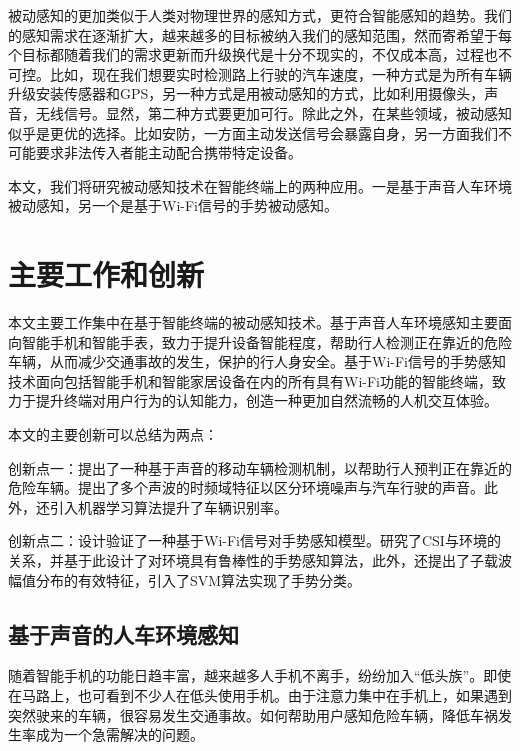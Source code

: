 
被动感知的更加类似于人类对物理世界的感知方式，更符合智能感知的趋势。我们的感知需求在逐渐扩大，越来越多的目标被纳入我们的感知范围，然而寄希望于每个目标都随着我们的需求更新而升级换代是十分不现实的，不仅成本高，过程也不可控。比如，现在我们想要实时检测路上行驶的汽车速度，一种方式是为所有车辆升级安装传感器和GPS，另一种方式是用被动感知的方式，比如利用摄像头，声音，无线信号。显然，第二种方式要更加可行。除此之外，在某些领域，被动感知似乎是更优的选择。比如安防，一方面主动发送信号会暴露自身，另一方面我们不可能要求非法传入者能主动配合携带特定设备。%

本文，我们将研究被动感知技术在智能终端上的两种应用。一是基于声音人车环境被动感知，另一个是基于Wi-Fi信号的手势被动感知。

\section{主要工作和创新}

本文主要工作集中在基于智能终端的被动感知技术。基于声音人车环境感知主要面向智能手机和智能手表，致力于提升设备智能程度，帮助行人检测正在靠近的危险车辆，从而减少交通事故的发生，保护的行人身安全。基于Wi-Fi信号的手势感知技术面向包括智能手机和智能家居设备在内的所有具有Wi-Fi功能的智能终端，致力于提升终端对用户行为的认知能力，创造一种更加自然流畅的人机交互体验。

本文的主要创新可以总结为两点：

创新点一：提出了一种基于声音的移动车辆检测机制，以帮助行人预判正在靠近的危险车辆。提出了多个声波的时频域特征以区分环境噪声与汽车行驶的声音。此外，还引入机器学习算法提升了车辆识别率。

创新点二：设计验证了一种基于Wi-Fi信号对手势感知模型。研究了CSI与环境的关系，并基于此设计了对环境具有鲁棒性的手势感知算法，此外，还提出了子载波幅值分布的有效特征，引入了SVM算法实现了手势分类。
\subsection{基于声音的人车环境感知}

随着智能手机的功能日趋丰富，越来越多人手机不离手，纷纷加入“低头族”。即使在马路上，也可看到不少人在低头使用手机。由于注意力集中在手机上，如果遇到突然驶来的车辆，很容易发生交通事故。如何帮助用户感知危险车辆，降低车祸发生率成为一个急需解决的问题。

